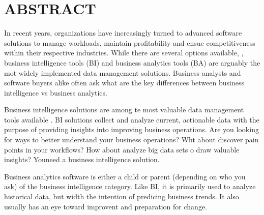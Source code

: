 \section{ABSTRACT } 

In recent years, organizations have increasingly turned to advanced software solutions to manage workloads, maintain profitability and ensue competitiveness within their respective industries. While there are several options available, , business intelligence tools (BI) and business analytics tools (BA) are arguably the mot widely implemented data management solutions. Business analysts and software buyers alike often ask what are the key differences between business intelligence vs business analytics.

Business intelligence solutions are among te most valuable data management tools available . BI solutions collect and analyze current, actionable data with the purpose of providing insights into improving business operations. Are you looking for ways to better understand your business operations? Wht about discover pain points in your workflows? How about analyze big data sets o draw valuable insights? Youneed a business intelligence solution.

Business analytics software is either a child or parent (depending on who you ask) of the business intelligence category. Like BI, it is primarily used to analyze historical data, but width the intention of predicing business trends. It also usually has an eye toward improvent and preparation for change.